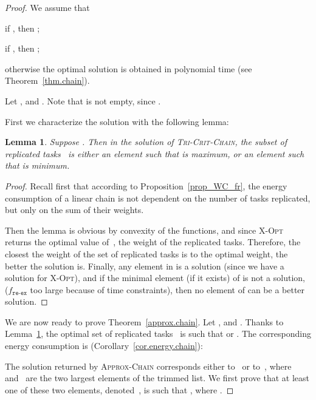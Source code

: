 \documentclass[a4paper]{article}
\theoremstyle{plain}
\newtheorem{lemma}{Lemma}
\theoremstyle{definition}
\theoremstyle{remark}
\newcommand{\freex}{\ensuremath{f_{\texttt{re-ex}}}\xspace}
\newcommand{\approxchain}{\textsc{Ap\-prox-Chain}}
\newcommand{\xopt}{\textsc{X-Opt}}
\newcommand{\chain}{\textsc{Tri-Crit-Chain}\xspace}
\begin{document}
\begin{proof}
We assume that
\begin{compactitem}
    \item if , then ; 
    \item if , then ; 
\end{compactitem}
otherwise the optimal solution is obtained in polynomial time (see
Theorem~\ref{thm.chain}).  









Let , and 
. 
Note that  is not empty, since . 


\smallskip
First we characterize the solution with the following lemma: 

\begin{lemma}
    \label{lemma.i1i2}
    Suppose .  Then in the solution of \chain, the
    subset of replicated tasks~ is either an element
     such that  is maximum, or an element
     such that  is minimum. 
\end{lemma}

\begin{proof}
Recall first that according to Proposition~\ref{prop_WC_fr}, the
  energy consumption of a linear chain is not dependent on the number
  of tasks replicated, but only on the sum of their weights. 

  Then the lemma is obvious by convexity of the functions, and 
since \xopt\xspace returns the
  optimal value of~, the weight of the replicated tasks.
  Therefore, the closest the weight of the set of replicated tasks is
  to the optimal weight, the better the solution is. Finally, any element in  is a solution (since we have a solution
  for \xopt), and if the minimal element (if it exists) of 
  is not a solution, (\freex too large because of time constraints),
  then no element of  can be a better solution. 
\end{proof}




We are now ready to prove Theorem~\ref{approx.chain}.  
Let , and 
 .  
Thanks to Lemma~\ref{lemma.i1i2}, the optimal set of replicated
tasks~ is such that  or . 
The corresponding energy consumption is (Corollary~\ref{cor.energy.chain}): 



The solution returned by \approxchain\xspace corresponds either to~ or to~, where  and~ are the
two largest elements of the trimmed list. We first prove that at least
one of these two elements, denoted~, is such that  
, where . 





\end{proof}
\end{document}
